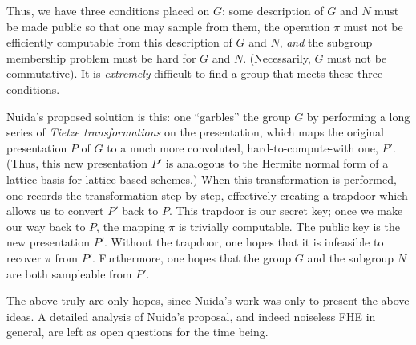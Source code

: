     Thus, we have three conditions placed on $G$: some description of $G$ and $N$ must be made public so that one may sample from them, the operation $\pi$ must not be efficiently computable from this description of $G$ and $N$, \emph{and} the subgroup membership problem must be hard for $G$ and $N$. (Necessarily, $G$ must not be commutative). It is \emph{extremely} difficult to find a group that meets these three conditions.

    Nuida's proposed solution is this: one ``garbles'' the group $G$ by performing a long series of \emph{Tietze transformations} on the presentation, which maps the original presentation $P$ of $G$ to a much more convoluted, hard-to-compute-with one, $P'$. (Thus, this new presentation $P'$ is analogous to the Hermite normal form of a lattice basis for lattice-based schemes.) When this transformation is performed, one records the transformation step-by-step, effectively creating a trapdoor which allows us to convert $P'$ back to $P$. This trapdoor is our secret key; once we make our way back to $P$, the mapping $\pi$ is trivially computable. The public key is the new presentation $P'$. Without the trapdoor, one hopes that it is infeasible to recover $\pi$ from $P'$. Furthermore, one hopes that the group $G$ and the subgroup $N$ are both sampleable from $P'$.

    The above truly are only hopes, since Nuida's work was only to present the above ideas. A detailed analysis of Nuida's proposal, and indeed noiseless FHE in general, are left as open questions for the time being.
